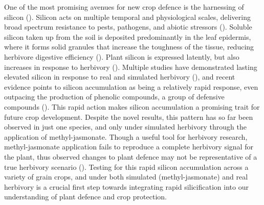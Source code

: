 \documentclass[12pt, letterpaper, ]{report}
\begin{document}
One of the most promising avenues for new crop defence is the harnessing of silicon (\cite{reynolds_silicon_2016}). Silicon acts on multiple temporal and physiological scales, delivering broad spectrum resistance to pests, pathogens, and abiotic stressors (\cite{cooke_consistent_2016,coskun_controversies_2019}). Soluble silicon taken up from the soil is deposited predominantly in the leaf epidermis, where it forms solid granules that increase the toughness of the tissue, reducing herbivore digestive efficiency (\cite{cooke_is_2011}). Plant silicon is expressed latently, but also increases in response to herbivory (\cite{takahashi_possibility_1990, }). Multiple studies have demonstrated lasting elevated silicon in response to real and simulated herbivory (\cite{massey_are_2008,hartley_ecology_2016}), and recent evidence points to silicon accumulation as being a relatively rapid response, even outpacing the production of phenolic compounds, a group of defensive compounds (\cite{waterman_short-term_2021}). This rapid action makes silicon accumulation a promising trait for future crop development. Despite the novel results, this pattern has so far been observed in just one species, and only under simulated herbivory through the application of methyl-jasmonate. Though a useful tool for herbivory research, methyl-jasmonate application fails to reproduce a complete herbivory signal for the plant, thus observed changes to plant defence may not be representative of a true herbivory scenario (\cite{strauss_direct_2002}). Testing for this rapid silicon accumulation across a variety of grain crops, and under both simulated (methyl-jasmonate) and real herbivory is a crucial first step towards integrating rapid silicification into our understanding of plant defence and crop protection.
\end{document}
